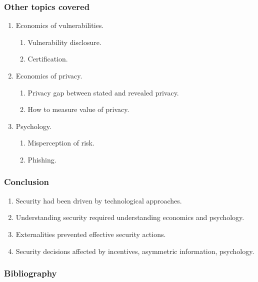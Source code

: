 \documentclass[handout, notes=hide]{beamer}
\begin{document}

\begin{frame}
\frametitle{Other topics covered}
\begin{enumerate}
\item Economics of vulnerabilities.
\begin{enumerate}
\item Vulnerability disclosure.
\item Certification.
\end{enumerate}
\item Economics of privacy.
\begin{enumerate}
\item Privacy gap between stated and revealed privacy.
\item How to measure value of privacy.
\end{enumerate}
\item Psychology.
\begin{enumerate}
\item Misperception of risk.
\item Phishing.
\end{enumerate}
\end{enumerate}
\end{frame}


\begin{frame}
\frametitle{Conclusion}
\begin{enumerate}
\item Security had been driven by technological approaches.
\item Understanding security required understanding economics and psychology.
\item Externalities prevented effective security actions.
\item Security decisions affected by incentives, asymmetric information, psychology.
\end{enumerate}


\end{frame}


\begin{frame}
\frametitle{Bibliography}
{\tiny


}%
\end{frame}

\end{document}
